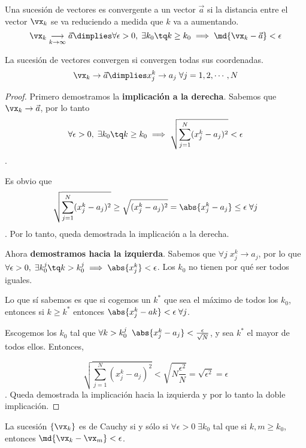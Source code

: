 \documentclass[12pt,a4paper,titlepage]{apuntes}
\begin{document}
\begin{defn} Una sucesión de vectores es convergente a un vector $\vec{a}$ si la distancia entre el vector $\vx_k$ se va reduciendo a medida que $k$ va a aumentando.
\[\vx_k \underset{k\to\infty}{\longrightarrow} \vec{a} \dimplies \forall \epsilon >0,\; \exists k_0 \tq k\geq k_0 \implies \md{\vx_k - \vec{a}} < \epsilon \]
\end{defn}

\begin{theorem} La sucesión de vectores convergen si convergen todas sus coordenadas.
\[\vx_k \to \vec{a} \dimplies x_j^k\to a_j \;\forall j = 1,2,\cdots, N\]
\end{theorem}

\begin{proof}
Primero demostramos la \textbf{implicación a la derecha}. Sabemos que $\vx_k\to\vec{a}$, por lo tanto $$\forall \epsilon > 0,\; \exists k_0 \tq k\geq k_0 \implies \sqrt{\sum_{j=1}^N(x_j^k-a_j)^2}<\epsilon$$.

Es obvio que \[\sqrt{\sum_{j=1}^N(x_j^k-a_j)^2}\geq \sqrt{(x_j^k-a_j)^2} = \abs{x_j^k-a_j}\leq \epsilon \;\forall j\]. Por lo tanto, queda demostrada la implicación a la derecha.

Ahora \textbf{demostramos hacia la izquierda}. Sabemos que $\forall j\; x_j^k \to a_j$, por lo que $\forall \epsilon > 0,\; \exists k_0^j \tq k>k_0^j \implies \abs{x_j^k} < \epsilon$. Los $k_0$ no tienen por qué ser todos iguales. 

Lo que sí sabemos es que si cogemos un $k^*$ que sea el máximo de todos los $k_0$, entonces si $k\geq k^*$ entonces $\abs{x_j^k-ak}<\epsilon\; \forall j$. 

Escogemos los $k_0$ tal que $\forall k > k_0^j\;\; \abs{x_j^k-a_j}<\frac{\epsilon}{\sqrt{N}}$, y sea $k^*$ el mayor de todos ellos. Entonces, 

\[\sqrt{\sum_{j=1}^N(x_j^k-a_j)^2} < \sqrt{N\frac{\epsilon^2}{N}} = \sqrt{\epsilon^2}=\epsilon\]. Queda demostrada la implicación hacia la izquierda y por lo tanto la doble implicación.
\end{proof}

\begin{defn}
La sucesión $\{\vx_k\}$ es de Cauchy si y sólo si $\forall \epsilon > 0 \; \exists k_0$ tal que si $k,m \geq k_0$, entonces $\md{\vx_k-\vx_m}<\epsilon$.
\end{defn}
\end{document}
